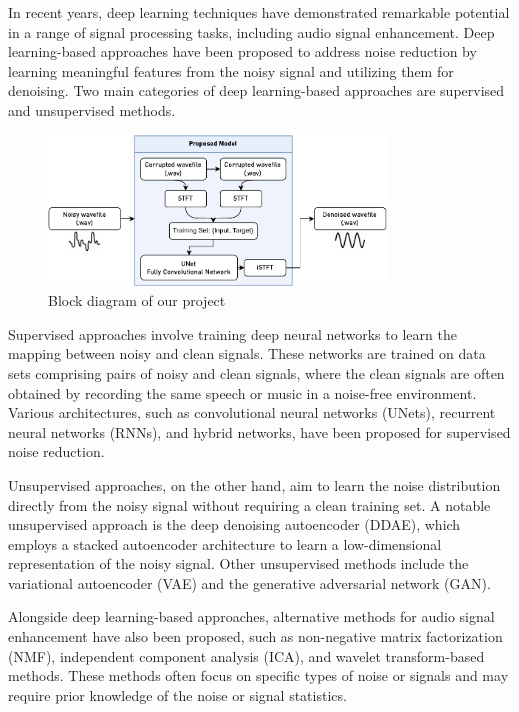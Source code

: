 \documentclass[conference]{IEEEtran}
\begin{document}
In recent years, deep learning techniques have demonstrated remarkable potential in a range of signal processing tasks, including audio signal enhancement.\cite{nicolson2019deep} Deep learning-based approaches have been proposed to address noise reduction by learning meaningful features from the noisy signal and utilizing them for denoising. Two main categories of deep learning-based approaches are supervised and unsupervised methods.

\begin{figure}[t!]
    \centering
    \includegraphics[width=0.8\textwidth]{figures/flow.pdf}
    \caption{Block diagram of our project}
    \label{fig:fig1}
\end{figure}

Supervised approaches involve training deep neural networks to learn the mapping between noisy and clean signals.\cite{michelsanti2021overview} These networks are trained on data sets comprising pairs of noisy and clean signals, where the clean signals are often obtained by recording the same speech or music in a noise-free environment. Various architectures, such as convolutional neural networks (UNets), recurrent neural networks (RNNs), and hybrid networks, have been proposed for supervised noise reduction.

Unsupervised approaches, on the other hand, aim to learn the noise distribution directly from the noisy signal without requiring a clean training set.\cite{tan2021towards} A notable unsupervised approach is the deep denoising autoencoder (DDAE), which employs a stacked autoencoder architecture to learn a low-dimensional representation of the noisy signal. Other unsupervised methods include the variational autoencoder (VAE) and the generative adversarial network (GAN).

Alongside deep learning-based approaches, alternative methods for audio signal enhancement have also been proposed, such as non-negative matrix factorization (NMF), independent component analysis (ICA), and wavelet transform-based methods.\cite{pandey2020cross} These methods often focus on specific types of noise or signals and may require prior knowledge of the noise or signal statistics.
\end{document}
